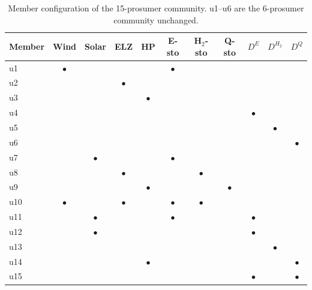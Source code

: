 \begin{table}[!t]
\caption{Member configuration of the 15-prosumer community. u1--u6 are the 6-prosumer community unchanged.}
\label{tab:config15}
\centering
\footnotesize
\setlength{\tabcolsep}{3pt}
\begin{tabular}{@{}lcccccccccc@{}}
\toprule
Member & Wind & Solar & ELZ & HP & E-sto & H$_2$-sto & Q-sto & $D^{E}$ & $D^{H_2}$ & $D^{Q}$ \\
\midrule
u1 & $\bullet$ &  &  &  & $\bullet$ &  &  &  &  &  \\
u2 &  &  & $\bullet$ &  &  &  &  &  &  &  \\
u3 &  &  &  & $\bullet$ &  &  &  &  &  &  \\
u4 &  &  &  &  &  &  &  & $\bullet$ &  &  \\
u5 &  &  &  &  &  &  &  &  & $\bullet$ &  \\
u6 &  &  &  &  &  &  &  &  &  & $\bullet$ \\
u7 &  & $\bullet$ &  &  & $\bullet$ &  &  &  &  &  \\
u8 &  &  & $\bullet$ &  &  & $\bullet$ &  &  &  &  \\
u9 &  &  &  & $\bullet$ &  &  & $\bullet$ &  &  &  \\
u10 & $\bullet$ &  & $\bullet$ &  & $\bullet$ & $\bullet$ &  &  &  &  \\
u11 &  & $\bullet$ &  &  & $\bullet$ &  &  & $\bullet$ &  &  \\
u12 &  & $\bullet$ &  &  &  &  &  & $\bullet$ &  &  \\
u13 &  &  &  &  &  &  &  &  & $\bullet$ &  \\
u14 &  &  &  & $\bullet$ &  &  &  &  &  & $\bullet$ \\
u15 &  &  &  &  &  &  &  & $\bullet$ &  & $\bullet$ \\
\bottomrule
\end{tabular}
\end{table}

